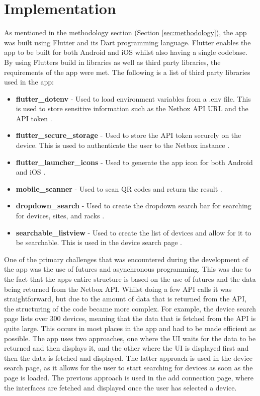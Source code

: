 \documentclass [11pt,a4paper]{article}
\begin{document}
\section{Implementation}
\label{sec:implementation}
As mentioned in the methodology section (Section \ref{sec:methodology}), the app was built using Flutter and its Dart programming language. Flutter enables the app to be built for both Android and iOS whilst also having a single codebase. By using Flutters build in libraries as well as third party libraries, the requirements of the app were met. The following is a list of third party libraries used in the app:
\begin{itemize}
    \item \textbf{flutter\_dotenv} - Used to load environment variables from a .env file. This is used to store sensitive information such as the Netbox API URL and the API token \cite{dot_env}.
    \item \textbf{flutter\_secure\_storage} - Used to store the API token securely on the device. This is used to authenticate the user to the Netbox instance \cite{secure_sec}.
    \item \textbf{flutter\_launcher\_icons} - Used to generate the app icon for both Android and iOS \cite{icon_launch}.
    \item \textbf{mobile\_scanner} - Used to scan QR codes and return the result \cite{barcodeScannerPlugin}.
    \item \textbf{dropdown\_search} - Used to create the dropdown search bar for searching for devices, sites, and racks \cite{dropdown}.
    \item \textbf{searchable\_listview} - Used to create the list of devices and allow for it to be searchable. This is used in the device search page \cite{searchable}. 
\end{itemize}

One of the primary challenges that was encountered during the development of the app was the use of futures and asynchronous programming. This was due to the fact that the apps entire structure is based on the use of futures and the data being returned from the Netbox API. Whilst doing a few API calls it was straightforward, but due to the amount of data that is returned from the API, the structuring of the code became more complex. For example, the device search page lists over 300 devices, meaning that the data that is fetched from the API is quite large. This occurs in most places in the app and had to be made efficient as possible. The app uses two approaches, one where the UI waits for the data to be returned and then displays it, and the other where the UI is displayed first and then the data is fetched and displayed. The latter approach is used in the device search page, as it allows for the user to start searching for devices as soon as the page is loaded. The previous approach is used in the add connection page, where the interfaces are fetched and displayed once the user has selected a device. 
\end{document}
